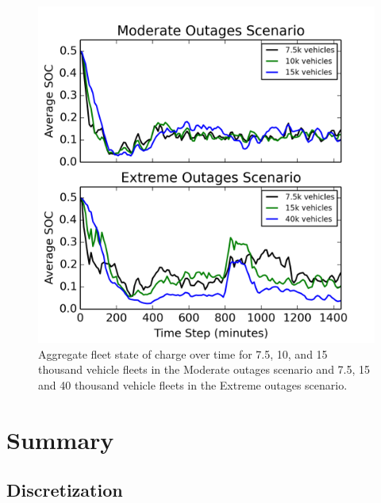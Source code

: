 \documentclass[journal]{IEEEtran}
\begin{document}
\begin{figure}[!htbp]
  \includegraphics[width=\linewidth]{plots/soc_v_time.png}
  \caption{Aggregate fleet state of charge over time for 7.5, 10, and 15 thousand vehicle fleets in the Moderate outages scenario and 7.5, 15 and 40 thousand vehicle fleets in the Extreme outages scenario.}
  \label{fig:soe}
\end{figure}


\section{Summary}




\subsection{Discretization}
\end{document}
